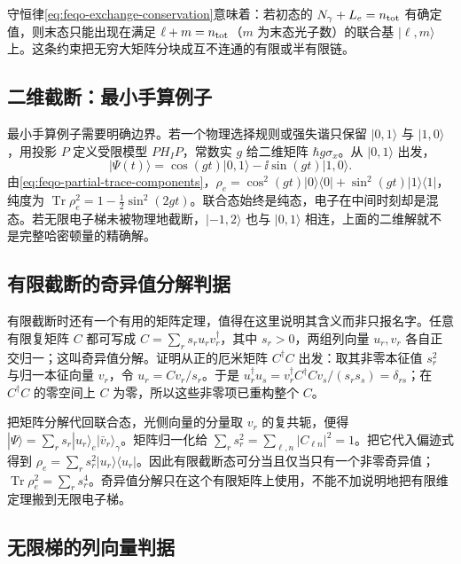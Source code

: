 守恒律\cref{eq:feqo-exchange-conservation}意味着：若初态的 \(N_\gamma+L_e=n_{\rm tot}\) 有确定值，则末态只能出现在满足 \(\ell+m=n_{\rm tot}\)（\(m\) 为末态光子数）的联合基 \(|\ell,m\rangle\) 上。这条约束把无穷大矩阵分块成互不连通的有限或半有限链。

\subsection{二维截断：最小手算例子}

最小手算例子需要明确边界。若一个物理选择规则或强失谐只保留 \(|0,1\rangle\) 与 \(|1,0\rangle\)，用投影 \(P\) 定义受限模型 \(PH_IP\)，常数实 \(g\) 给二维矩阵 \(\hbar g\sigma_x\)。从 \(|0,1\rangle\) 出发，
\[
|\Psi(t)\rangle=\cos(gt)|0,1\rangle-\ii\sin(gt)|1,0\rangle.
\]
由\cref{eq:feqo-partial-trace-components}，\(\rho_e=\cos^2(gt)|0\rangle\langle0|+\sin^2(gt)|1\rangle\langle1|\)，纯度为 \(\operatorname{Tr}\rho_e^2=1-\tfrac12\sin^2(2gt)\)。联合态始终是纯态，电子在中间时刻却是混态。若无限电子梯未被物理地截断，\(|-1,2\rangle\) 也与 \(|0,1\rangle\) 相连，上面的二维解就不是完整哈密顿量的精确解。

\subsection{有限截断的奇异值分解判据}

有限截断时还有一个有用的矩阵定理，值得在这里说明其含义而非只报名字。任意有限复矩阵 \(C\) 都可写成 \(C=\sum_r s_r u_rv_r^\dagger\)，其中 \(s_r>0\)，两组列向量 \(u_r,v_r\) 各自正交归一；这叫奇异值分解。证明从正的厄米矩阵 \(C^\dagger C\) 出发：取其非零本征值 \(s_r^2\) 与归一本征向量 \(v_r\)，令 \(u_r=Cv_r/s_r\)。于是 \(u_r^\dagger u_s=v_r^\dagger C^\dagger Cv_s/(s_rs_s)=\delta_{rs}\)；在 \(C^\dagger C\) 的零空间上 \(C\) 为零，所以这些非零项已重构整个 \(C\)。

把矩阵分解代回联合态，光侧向量的分量取 \(v_r\) 的复共轭，便得 \(|\Psi\rangle=\sum_r s_r|u_r\rangle_e|\bar v_r\rangle_\gamma\)。矩阵归一化给 \(\sum_rs_r^2=\sum_{\ell,n}|C_{\ell n}|^2=1\)。把它代入偏迹式得到 \(\rho_e=\sum_rs_r^2|u_r\rangle\langle u_r|\)。因此有限截断态可分当且仅当只有一个非零奇异值；\(\operatorname{Tr}\rho_e^2=\sum_rs_r^4\)。奇异值分解只在这个有限矩阵上使用，不能不加说明地把有限维定理搬到无限电子梯。

\subsection{无限梯的列向量判据}

